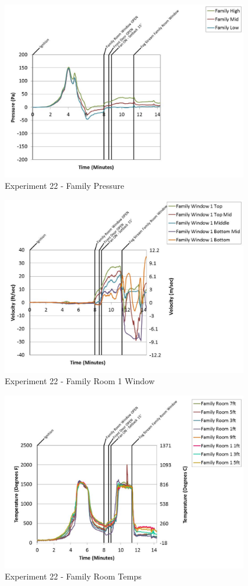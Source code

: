 \documentclass{article}
\begin{document}
\begin{appendices}
	\clearpage

	\begin{figure}[h!]
		\centering
		\includegraphics[height=3.05in]{0_Images/Results_Charts/Exp_22_Charts/FamilyPressure.pdf}
		\caption{Experiment 22 - Family Pressure}
	\end{figure}
 

	\begin{figure}[h!]
		\centering
		\includegraphics[height=3.05in]{0_Images/Results_Charts/Exp_22_Charts/FamilyRoom1Window.pdf}
		\caption{Experiment 22 - Family Room 1 Window}
	\end{figure}
 
	\clearpage

	\begin{figure}[h!]
		\centering
		\includegraphics[height=3.05in]{0_Images/Results_Charts/Exp_22_Charts/FamilyRoomTemps.pdf}
		\caption{Experiment 22 - Family Room Temps}
	\end{figure}
 


\end{appendices}
\end{document}
